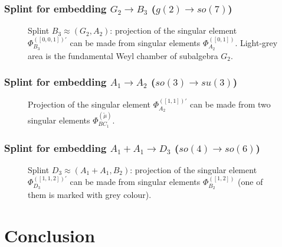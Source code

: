 \documentclass[pdftex]{beamer}
\theoremstyle{definition} \newtheorem{Def}{Definition}
\begin{document}
\begin{frame}
  \frametitle{Splint for embedding $G_2\rightarrow B_3$ ($g(2)\rightarrow so(7)$)}

  \begin{figure}[h]
    \caption{Splint $B_3\approx (G_2,A_2)$: projection of the singular element $\Phi_{B_3}^{([0,0,1])'}$ can be made from singular elements $\Phi_{A_2}^{([0,1])}$. Light-grey area is the fundamental Weyl chamber of subalgebra $G_2$.}
    \label{ris6}
  \end{figure}


\end{frame}

\begin{frame}
  \frametitle{Splint for embedding $A_1\rightarrow A_2$ ($so(3)\rightarrow su(3)$)}

  \begin{figure}[h]
    \label {a5}
    \caption{Projection of the singular element $\Phi_{A_2}^{([1,1])'}$ can be made from two singular elements $\Phi_{BC_1}^{(\tilde{\mu})}$.}
  \end{figure}


\end{frame}

\begin{frame}
  \frametitle{Splint for embedding $A_1+A_1\rightarrow D_3$ ($so(4)\rightarrow so(6)$)}

  \begin{figure}[h]
    \caption{Splint $D_3\approx (A_1+A_1,B_2)$: projection of the singular element $\Phi_{D_3}^{([1,1,2])'}$ can be made from singular elements $\Phi_{B_2}^{([1,2])}$ (one of them is marked with grey colour).}
    \label{ris4}
  \end{figure}


\end{frame}

\section{Conclusion}
\end{document}
